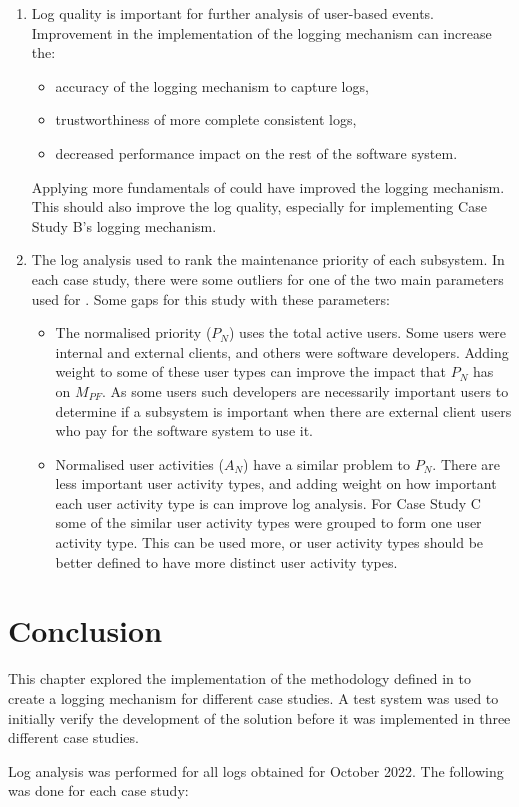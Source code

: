 \begin{enumerate}
	\item Log quality is important for further analysis of user-based events. Improvement in the implementation of the logging mechanism can increase the:
		\begin{itemize}
			\item accuracy of the logging mechanism to capture logs,
			\item trustworthiness of more complete consistent logs,
			\item decreased performance impact on the rest of the software system.
		\end{itemize}
	Applying more fundamentals of  could have improved the logging mechanism. This should also improve the log quality, especially for implementing Case Study B's logging mechanism.
	\item The log analysis used  to rank the maintenance priority of each subsystem. In each case study, there were some outliers for one of the two main parameters used for . Some gaps for this study with these parameters:
		\begin{itemize}
			\item The normalised priority ($P_N$) uses the total active users. Some users were internal and external clients, and others were software developers. Adding weight to some of these user types can improve the impact that $P_N$ has on $M_{PF}$. As some users such developers are necessarily important users to determine if a subsystem is important when there are external client users who pay for the software system to use it.
			\item Normalised user activities ($A_N$) have a similar problem to $P_N$. There are less important user activity types, and adding weight on how important each user activity type is can improve log analysis. For Case Study C some of the similar user activity types were grouped to form one user activity type. This can be used more, or user activity types should be better defined to have more distinct user activity types.
		\end{itemize}
\end{enumerate}

\clearpage

\section{Conclusion}
This chapter explored the implementation of the methodology defined in  to create a logging mechanism for different case studies. A test system was used to initially verify the development of the solution before it was implemented in three different case studies.\par Log analysis was performed for all logs obtained for October 2022. The following was done for each case study:

